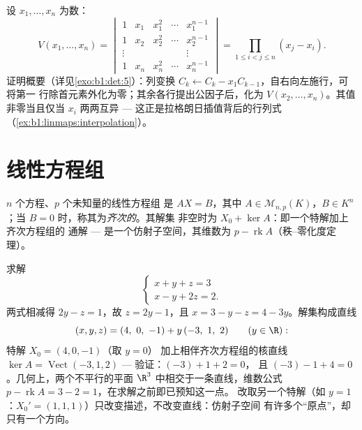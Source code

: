 \begin{example}[范德蒙德行列式]\label{ex:b1:det:vandermonde}
设 $x_1, \dots, x_n$ 为数：
\[
V(x_1, \dots, x_n) =
\begin{vmatrix}
1 & x_1 & x_1^2 & \cdots & x_1^{n-1}\\
1 & x_2 & x_2^2 & \cdots & x_2^{n-1}\\
\vdots & & & & \vdots\\
1 & x_n & x_n^2 & \cdots & x_n^{n-1}
\end{vmatrix}
= \prod_{1 \leq i < j \leq n} (x_j - x_i) .
\]
证明概要（详见\cref{exo:b1:det:5}）：列变换
$C_k \leftarrow C_k - x_1 C_{k-1}$，自右向左施行，可将第一
行除首元素外化为零；其余各行提出公因子后，化为
$V(x_2, \dots, x_n)$。其值非零当且仅当 $x_i$ 两两互异
--- 这正是拉格朗日插值背后的行列式
（\cref{ex:b1:linmaps:interpolation}）。
\end{example}

\section{线性方程组}

\begin{definition}\label{def:b1:det:system}
$n$ 个方程、$p$ 个未知量的线性方程组
是 $AX = B$，其中 $A \in \mathcal{M}_{n,p}(K)$，$B \in
K^n$；当 $B = 0$ 时，称其为\emph{齐次的}。其解集
非空时为 $X_0 + \ker A$：即一个特解加上齐次方程组的
通解 --- 是一个仿射子空间，其维数为 $p -
\operatorname{rk} A$（秩--零化度定理）。
\end{definition}

\begin{example}[仿射结构的直观展示]
\label{ex:b1:det:affinestructure}
求解
\[
\begin{cases}
x + y + z = 3\\
x - y + 2z = 2 .
\end{cases}
\]
两式相减得 $2y - z = 1$，故 $z = 2y - 1$，且 $x =
3 - y - z = 4 - 3y$。解集构成直线
\[
(x, y, z) = (4,\ 0,\ -1) + y\,(-3,\ 1,\ 2)
\qquad (y \in \R):
\]
特解 $X_0 = (4, 0, -1)$（取 $y = 0$）
加上相伴齐次方程组的核直线 $\ker A = \operatorname{Vect}(-3, 1, 2)$
--- 验证：$(-3) + 1 + 2 = 0$，
且 $(-3) - 1 + 4 = 0$。几何上，两个不平行的平面
$\R^3$ 中相交于一条直线，维数公式 $p -
\operatorname{rk} A = 3 - 2 = 1$，在求解之前即已预知这一点。
改取另一个特解（如 $y = 1$：$X_0' =
(1, 1, 1)$）只改变描述，不改变直线：仿射子空间
有许多个“原点”，却只有一个方向。
\end{example}

